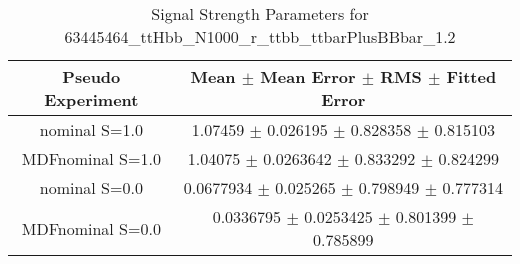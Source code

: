 \begin{table}
\centering
\caption{Signal Strength Parameters for 63445464\_ttHbb\_N1000\_r\_ttbb\_ttbarPlusBBbar\_1.2}
\begin{tabular}{cc}
\toprule
Pseudo Experiment & Mean $\pm$ Mean Error $\pm$ RMS $\pm$ Fitted Error\\
\midrule
nominal S=1.0 & \num{1.07459} $\pm$ \num{0.026195} $\pm$ \num{0.828358} $\pm$ \num{0.815103}\\
MDFnominal S=1.0 & \num{1.04075} $\pm$ \num{0.0263642} $\pm$ \num{0.833292} $\pm$ \num{0.824299}\\
nominal S=0.0 & \num{0.0677934} $\pm$ \num{0.025265} $\pm$ \num{0.798949} $\pm$ \num{0.777314}\\
MDFnominal S=0.0 & \num{0.0336795} $\pm$ \num{0.0253425} $\pm$ \num{0.801399} $\pm$ \num{0.785899}\\
\bottomrule
\end{tabular}
\end{table}